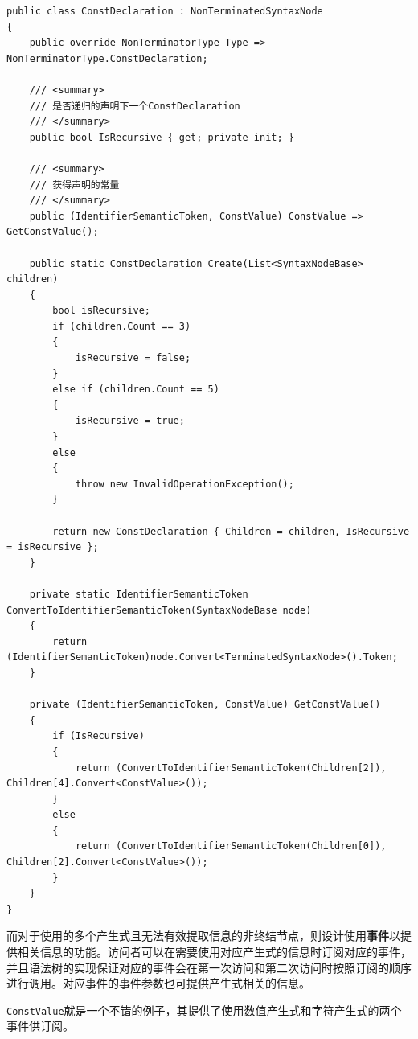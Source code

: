 \documentclass[../main.tex]{subfiles}
\begin{document}
\begin{lstlisting}[style=csharp]
public class ConstDeclaration : NonTerminatedSyntaxNode
{
    public override NonTerminatorType Type => NonTerminatorType.ConstDeclaration;

    /// <summary>
    /// 是否递归的声明下一个ConstDeclaration
    /// </summary>
    public bool IsRecursive { get; private init; }

    /// <summary>
    /// 获得声明的常量
    /// </summary>
    public (IdentifierSemanticToken, ConstValue) ConstValue => GetConstValue();

    public static ConstDeclaration Create(List<SyntaxNodeBase> children)
    {
        bool isRecursive;
        if (children.Count == 3)
        {
            isRecursive = false;
        }
        else if (children.Count == 5)
        {
            isRecursive = true;
        }
        else
        {
            throw new InvalidOperationException();
        }

        return new ConstDeclaration { Children = children, IsRecursive = isRecursive };
    }

    private static IdentifierSemanticToken ConvertToIdentifierSemanticToken(SyntaxNodeBase node)
    {
        return (IdentifierSemanticToken)node.Convert<TerminatedSyntaxNode>().Token;
    }

    private (IdentifierSemanticToken, ConstValue) GetConstValue()
    {
        if (IsRecursive)
        {
            return (ConvertToIdentifierSemanticToken(Children[2]), Children[4].Convert<ConstValue>());
        }
        else
        {
            return (ConvertToIdentifierSemanticToken(Children[0]), Children[2].Convert<ConstValue>());
        }
    }
}
\end{lstlisting}

而对于使用的多个产生式且无法有效提取信息的非终结节点，则设计使用\textbf{事件}以提供相关信息的功能。访问者可以在需要使用对应产生式的信息时订阅对应的事件，并且语法树的实现保证对应的事件会在第一次访问和第二次访问时按照订阅的顺序进行调用。对应事件的事件参数也可提供产生式相关的信息。

\texttt{ConstValue}就是一个不错的例子，其提供了使用数值产生式和字符产生式的两个事件供订阅。
\end{document}
